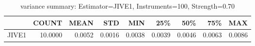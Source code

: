 \begin{table}[ht]
\centering
\caption{variance summary: Estimator=JIVE1, Instruments=100, Strength=0.70}
\begin{tabular}{lrrrrrrrr}
\toprule
 & COUNT & MEAN & STD & MIN & 25\% & 50\% & 75\% & MAX \\
\midrule
JIVE1 & 10.0000 & 0.0052 & 0.0016 & 0.0038 & 0.0039 & 0.0046 & 0.0063 & 0.0086 \\
\bottomrule
\end{tabular}
\end{table}
